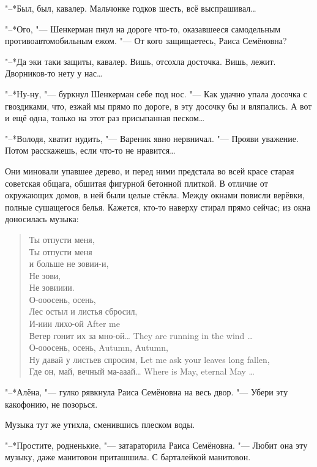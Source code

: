 "--*Был, был, кавалер.
Мальчонке годков шесть, всё выспрашивал\ldots{}

"--*Ого, "--- Шенкерман пнул на дороге что-то, оказавшееся самодельным противоавтомобильным ежом.
"--- От кого защищаетесь, Раиса Семёновна?

"--*Да эки таки защиты, кавалер.
Вишь, отсохла досточка.
Вишь, лежит.
Дворников-то нету у нас\ldots{}

"--*Ну-ну, "--- буркнул Шенкерман себе под нос.
"--- Как удачно упала досочка с гвоздиками, что, езжай мы прямо по дороге, в эту досочку бы и вляпались.
А вот и ещё одна, только на этот раз присыпанная песком\ldots{}

"--*Володя, хватит нудить, "--- Вареник явно нервничал.
"--- Прояви уважение.
Потом расскажешь, если что-то не нравится\ldots{}

Они миновали упавшее дерево, и перед ними предстала во всей красе старая советская общага, обшитая фигурной бетонной плиткой.
В отличие от окружающих домов, в ней были целые стёкла.
Между окнами повисли верёвки, полные сушащегося белья.
Кажется, кто-то наверху стирал прямо сейчас;
из окна доносилась музыка:

\begin{quote}
Ты отпусти меня,\\
Ты отпусти меня\\
и больше не зовии-и,\\
Не зови,\\
Не зовииии.\\
О-ооосень, осень,\\
Лес остыл и листья сбросил,\\
{И-иии лихо-ой}
{After me}\\
{Ветер гонит их за мно-ой\ldots{}}
{They are running in the wind \ldots{}}\\
{О-ооосень, осень,}
{Autumn, Autumn,}\\
{Ну давай у листьев спросим,}
{Let me ask your leaves long fallen,}\\
{Где он, май, вечный ма-ааай\ldots{}}
{Where is May, eternal May \ldots{}}
\end{quote}

"--*Алёна, "--- гулко рявкнула Раиса Семёновна на весь двор.
"--- Убери эту какофонию, не позорься.

Музыка тут же утихла, сменившись плеском воды.

"--*Простите, родненькие, "--- затараторила Раиса Семёновна.
"--- Любит она эту музыку, даже манитовон приташшила.
С барталейкой манитовон.

